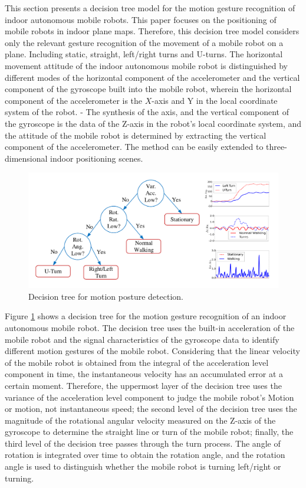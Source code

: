 \documentclass{llncs}
\begin{document}
This section presents a decision tree model for the motion gesture recognition of indoor autonomous mobile robots. This paper focuses on the positioning of mobile robots in indoor plane maps. Therefore, this decision tree model considers only the relevant gesture recognition of the movement of a mobile robot on a plane. Including static, straight, left/right turns and U-turns.
The horizontal movement attitude of the indoor autonomous mobile robot is distinguished by different modes of the horizontal component of the accelerometer and the vertical component of the gyroscope built into the mobile robot, wherein the horizontal component of the accelerometer is the $X$-axis and Y in the local coordinate system of the robot. - The synthesis of the axis, and the vertical component of the gyroscope is the data of the Z-axis in the robot's local coordinate system, and the attitude of the mobile robot is determined by extracting the vertical component of the accelerometer. The method can be easily extended to three-dimensional indoor positioning scenes.

\begin{figure}[!htbp]
	\centering
	\includegraphics[width=4.85in]{AiFiMatch-ActivityDecision}
	\caption{Decision tree for motion posture detection.}
	\label{fig-posture}
\end{figure}


Figure \ref{fig-posture} shows a decision tree for the motion gesture recognition of an indoor autonomous mobile robot. The decision tree uses the built-in acceleration of the mobile robot and the signal characteristics of the gyroscope data to identify different motion gestures of the mobile robot. Considering that the linear velocity of the mobile robot is obtained from the integral of the acceleration level component in time, the instantaneous velocity has an accumulated error at a certain moment. Therefore, the uppermost layer of the decision tree uses the variance of the acceleration level component to judge the mobile robot's Motion or motion, not instantaneous speed; the second level of the decision tree uses the magnitude of the rotational angular velocity measured on the Z-axis of the gyroscope to determine the straight line or turn of the mobile robot; finally, the third level of the decision tree passes through the turn process. The angle of rotation is integrated over time to obtain the rotation angle, and the rotation angle is used to distinguish whether the mobile robot is turning left/right or turning.
\end{document}
